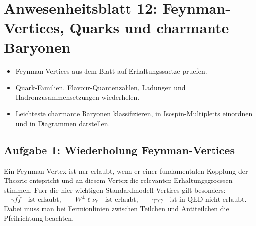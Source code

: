 \documentclass[11pt,a4paper]{scrartcl}
\begin{document}
\section{Anwesenheitsblatt 12: Feynman-Vertices, Quarks und charmante Baryonen}
\begin{taskbox}[title={Aufgaben}]
\begin{itemize}
\item Feynman-Vertices aus dem Blatt auf Erhaltungssaetze pruefen.
\item Quark-Familien, Flavour-Quantenzahlen, Ladungen und Hadronzusammensetzungen wiederholen.
\item Leichteste charmante Baryonen klassifizieren, in Isospin-Multipletts einordnen und in Diagrammen darstellen.
\end{itemize}
\end{taskbox}

\subsection{Aufgabe 1: Wiederholung Feynman-Vertices}
\begin{learningbox}
Ein Feynman-Vertex ist nur erlaubt, wenn er einer fundamentalen Kopplung der Theorie entspricht und an diesem Vertex die relevanten Erhaltungsgroessen stimmen. Fuer die hier wichtigen Standardmodell-Vertices gilt besonders:
\[
\gamma f\bar f \quad\text{ist erlaubt,}\qquad W^\pm \ell \nu_\ell \quad\text{ist erlaubt,}\qquad \gamma\gamma\gamma \quad\text{ist in QED nicht erlaubt.}
\]
Dabei muss man bei Fermionlinien zwischen Teilchen und Antiteilchen die Pfeilrichtung beachten.
\end{learningbox}
\end{document}
